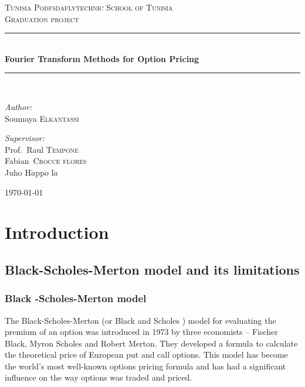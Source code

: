 \documentclass[12pt]{report}
\newcommand{\HRule}{\rule{\linewidth}{0.5mm}}
\begin{document}
\begin{titlepage}
\begin{center}
\textsc{\Large Tunisia Podfsdaflytechnic School of Tunisia}\\[1.5cm]
\textsc{\Large Graduation project}\\[0.5cm]
\HRule \\[0.4cm]
{ \huge \bfseries Fourier Transform Methods for Option Pricing \\[0.4cm] }

\HRule \\[1.5cm]

\noindent
\begin{minipage}[t]{0.4\textwidth}
\begin{flushleft} \large
\emph{Author:}\\
Soumaya \textsc{Elkantassi}
\end{flushleft}
\end{minipage}%
\begin{minipage}[t]{0.6\textwidth}
\begin{flushright} \large
\emph{Supervisor:} \\
Prof.~Raul \textsc{Tempone}\\
Fabian\textsc{~Crocce flores}\\
Juho H$\ddot{a}$pp$\ddot{o}$
l$\ddot{a}
$
\end{flushright}
\end{minipage}
\vfill
{\large \today}
\end{center}
\end{titlepage}



\part{Introduction}
\chapter{Black-Scholes-Merton model and its limitations}
\section{Black -Scholes-Merton model}
The Black-Scholes-Merton (or Black and Scholes ) model for evaluating the premium of an option was introduced in 1973 by three economists – Fischer Black, Myron Scholes and Robert Merton.  They developed a formula to calculate the theoretical  price of European put and call options. This model has become the world's most well-known options pricing formula and has had a significant influence on the way options was traded and priced.\\
\end{document}
